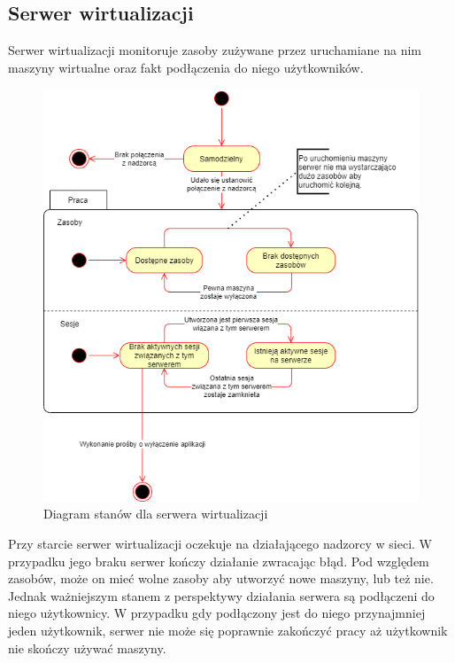\documentclass[../opis-rozwiazania.tex]{subfiles}
\begin{document}
\subsection{Serwer wirtualizacji}

Serwer wirtualizacji monitoruje zasoby zużywane przez uruchamiane na nim maszyny wirtualne oraz fakt podłączenia do niego użytkowników.

\begin{figure}[H]
    \centering
    \includegraphics[width=\textwidth]{../diagrams/state_diagrams/virtualisation_server.png}
    \caption{Diagram stanów dla serwera wirtualizacji}
    \label{state_virtsrv}
\end{figure}

Przy starcie serwer wirtualizacji oczekuje na działającego nadzorcy w sieci.
W przypadku jego braku serwer kończy działanie zwracając błąd.
Pod względem zasobów, może on mieć wolne zasoby aby utworzyć nowe maszyny, lub też nie.
Jednak ważniejszym stanem z perspektywy działania serwera są podłączeni do niego użytkownicy.
W przypadku gdy podłączony jest do niego przynajmniej jeden użytkownik, serwer nie może się poprawnie zakończyć pracy aż użytkownik nie skończy używać maszyny.
\end{document}
